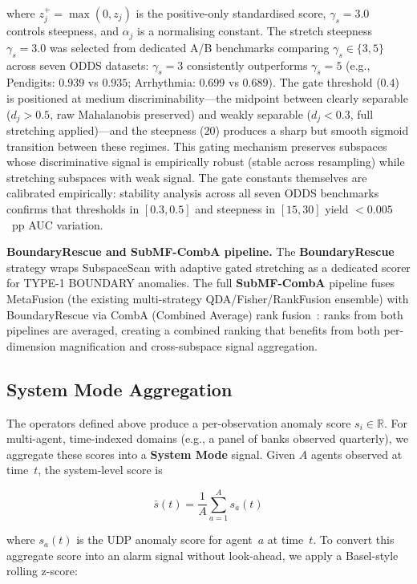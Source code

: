 \documentclass[journal]{IEEEtran}
\newcommand{\R}{\mathbb{R}}
\begin{document}
where $z_j^{+} = \max(0, z_j)$ is the positive-only standardised score, $\gamma_s = 3.0$ controls steepness, and $\alpha_j$ is a normalising constant. The stretch steepness $\gamma_s = 3.0$ was selected from dedicated A/B benchmarks comparing $\gamma_s \in \{3, 5\}$ across seven ODDS datasets: $\gamma_s{=}3$ consistently outperforms $\gamma_s{=}5$ (e.g., Pendigits: $0.939$ vs $0.935$; Arrhythmia: $0.699$ vs $0.689$).  The gate threshold ($0.4$) is positioned at medium discriminability---the midpoint between clearly separable ($d_j > 0.5$, raw Mahalanobis preserved) and weakly separable ($d_j < 0.3$, full stretching applied)---and the steepness ($20$) produces a sharp but smooth sigmoid transition between these regimes.  This gating mechanism preserves subspaces whose discriminative signal is empirically robust (stable across resampling) while stretching subspaces with weak signal.  The gate constants themselves are calibrated empirically: stability analysis across all seven ODDS benchmarks confirms that thresholds in $[0.3, 0.5]$ and steepness in $[15, 30]$ yield $<0.005$~pp AUC variation.

\textbf{BoundaryRescue and SubMF-CombA pipeline.} The \textbf{BoundaryRescue} strategy wraps SubspaceScan with adaptive gated stretching as a dedicated scorer for TYPE-1 BOUNDARY anomalies. The full \textbf{SubMF-CombA} pipeline fuses MetaFusion (the existing multi-strategy QDA/Fisher/RankFusion ensemble) with BoundaryRescue via CombA (Combined Average) rank fusion~\cite{fox1994combination}: ranks from both pipelines are averaged, creating a combined ranking that benefits from both per-dimension magnification and cross-subspace signal aggregation.

\subsection{System Mode Aggregation}
\label{ssec:system_mode}

The operators defined above produce a per-observation anomaly score $s_i \in \R$.  For multi-agent, time-indexed domains (e.g., a panel of banks observed quarterly), we aggregate these scores into a \textbf{System Mode} signal.  Given $A$ agents observed at time~$t$, the system-level score is

\begin{equation}
\bar{s}(t) = \frac{1}{A}\sum_{a=1}^{A} s_a(t)
\label{eq:system_score}
\end{equation}

where $s_a(t)$ is the UDP anomaly score for agent~$a$ at time~$t$.  To convert this aggregate score into an alarm signal without look-ahead, we apply a Basel-style rolling z-score:
\end{document}
